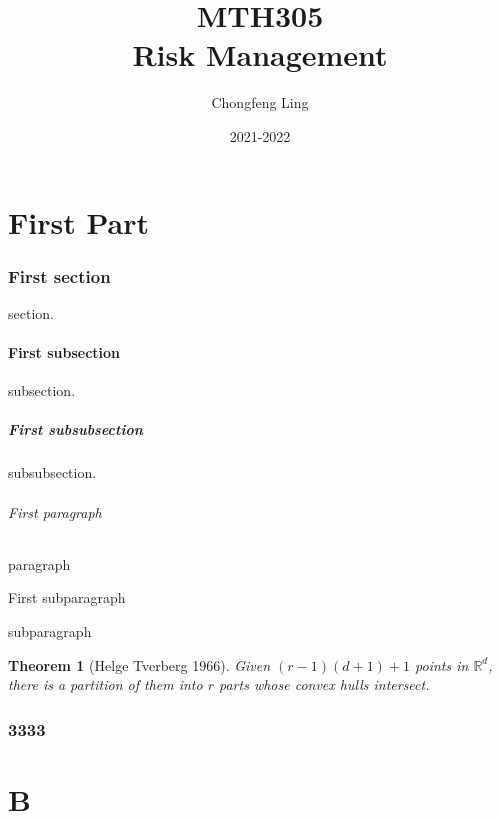 \documentclass[12pt, a4paper, oneside]{article}
\title{{\Huge{\textbf{MTH305}}}\\\Huge{\textbf{Risk Management}}}
\author{Chongfeng Ling}
\date{2021-2022}
\newtheorem{theorem}{Theorem}
\newcommand{\rr}{\mathbb{R}}
\begin{document}
\null  %
\nointerlineskip  %
\vfill
\let\snewpage \newpage
\let\newpage \relax
\maketitle
\setcounter{page}{0}
\thispagestyle{empty}
\let \newpage \snewpage
\vfill
\break %

\newpage
{}
\setcounter{page}{1}
\tableofcontents


\renewcommand\thepart{\Alph{part}}

\newpage
\setcounter{page}{1}

\part{First Part}

\section{First section}
section.

\subsection{First subsection}
subsection.

\subsubsection{First subsubsection}
subsubsection.

\paragraph{First paragraph}
paragraph

\subparagraph{First subparagraph}
subparagraph

\begin{theorem}[Helge Tverberg 1966]
    Given $(r-1)(d+1)+1$ points in $\rr^d$, there is a partition of them into $r$ parts whose convex hulls intersect.
\end{theorem}

\section{3333}


\newpage
\part{B}
\end{document}
